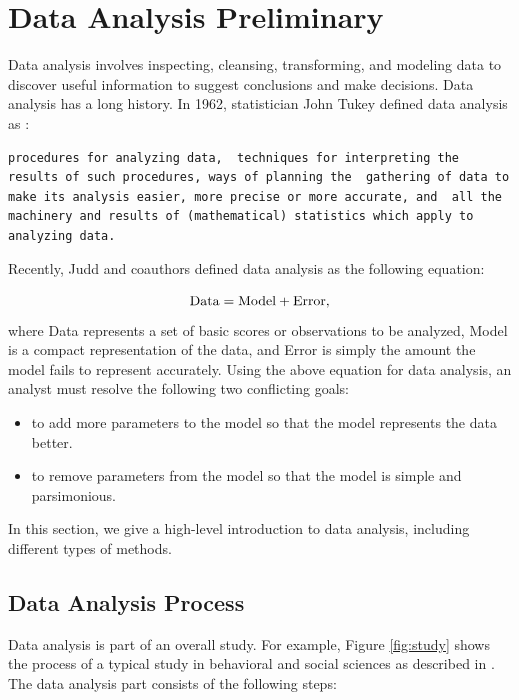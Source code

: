 \documentclass[]{book}
\providecommand{\tightlist}{%
  \setlength{\itemsep}{0pt}\setlength{\parskip}{0pt}}
\theoremstyle{definition}
\theoremstyle{definition}
\theoremstyle{definition}
\theoremstyle{remark}
\begin{document}
\section{Data Analysis Preliminary}\label{data-analysis-preliminary}

Data analysis involves inspecting, cleansing, transforming, and modeling
data to discover useful information to suggest conclusions and make
decisions. Data analysis has a long history. In 1962, statistician John
Tukey defined data analysis as \citep{tukey1962data}:

\begin{verbatim}
procedures for analyzing data,  techniques for interpreting the results of such procedures, ways of planning the  gathering of data to make its analysis easier, more precise or more accurate, and  all the machinery and results of (mathematical) statistics which apply to analyzing data.
\end{verbatim}

Recently, Judd and coauthors defined data analysis as the following
equation\citep{judd2017}:

\[\hbox{Data} = \hbox{Model} + \hbox{Error},\] where Data represents a
set of basic scores or observations to be analyzed, Model is a compact
representation of the data, and Error is simply the amount the model
fails to represent accurately. Using the above equation for data
analysis, an analyst must resolve the following two conflicting goals:

\begin{itemize}
\tightlist
\item
  to add more parameters to the model so that the model represents the
  data better.
\item
  to remove parameters from the model so that the model is simple and
  parsimonious.
\end{itemize}

In this section, we give a high-level introduction to data analysis,
including different types of methods.

\subsection{Data Analysis Process}\label{S:process}

Data analysis is part of an overall study. For example, Figure
\ref{fig:study} shows the process of a typical study in behavioral and
social sciences as described in \citep{albers2017}. The data analysis
part consists of the following steps:
\end{document}
